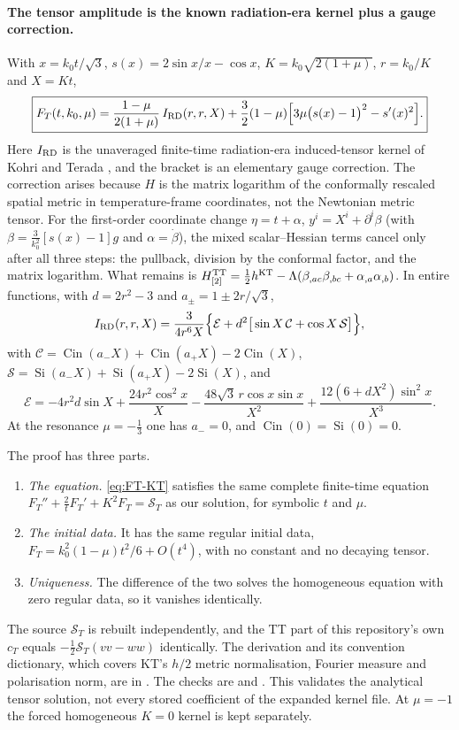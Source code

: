 \documentclass[11pt]{article}
\theoremstyle{definition}
\theoremstyle{remark}
\newcommand{\Cin}{\operatorname{Cin}}
\newcommand{\Si}{\operatorname{Si}}
\begin{document}
\paragraph{The tensor amplitude is the known radiation-era kernel plus a gauge correction.}
With $x=k_0t/\sqrt3$, $s(x)=2\sin x/x-\cos x$, $K=k_0\sqrt{2(1+\mu)}$, $r=k_0/K$ and $X=Kt$,
\begin{equation}\label{eq:FT-KT}
\boxed{F_T(t,k_0,\mu)=\frac{1-\mu}{2(1+\mu)}\,I_{\rm RD}(r,r,X)
+\frac32(1-\mu)\Big[3\mu\big(s(x)-1\big)^2-s'(x)^2\Big].}
\end{equation}
Here $I_{\rm RD}$ is the unaveraged finite-time radiation-era induced-tensor kernel of
Kohri and Terada \cite{KohriTerada}, and the bracket is an elementary gauge correction. The
correction arises because $H$ is the matrix logarithm of the conformally rescaled spatial
metric in temperature-frame coordinates, not the Newtonian metric tensor. For the first-order
coordinate change $\eta=t+\alpha$, $y^i=X^i+\partial^i\beta$ (with $\beta=\frac3{k_0^2}[s(x)-1]g$
and $\alpha=\dot\beta$), the mixed scalar--Hessian terms cancel only after all three steps: the
pullback, division by the conformal factor, and the matrix logarithm. What remains is
$H^{\rm TT}_{[2]}=\frac12h^{\rm KT}-\Lambda(\beta_{,ac}\beta_{,bc}+\alpha_{,a}\alpha_{,b})$.
In entire functions, with $d=2r^2-3$ and $a_\pm=1\pm2r/\sqrt3$,
\[
I_{\rm RD}(r,r,X)=\frac{3}{4r^6X}\Big\{\mathcal E+d^2\big[\sin X\,\mathcal C+\cos X\,\mathcal S\big]\Big\},
\]
with $\mathcal C=\Cin(a_-X)+\Cin(a_+X)-2\Cin(X)$, $\mathcal S=\Si(a_-X)+\Si(a_+X)-2\Si(X)$, and
\[
\mathcal E=-4r^2d\sin X+\frac{24r^2\cos^2x}X-\frac{48\sqrt3\,r\cos x\sin x}{X^2}+\frac{12(6+dX^2)\sin^2x}{X^3}.
\]
At the resonance $\mu=-\frac13$ one has $a_-=0$, and $\Cin(0)=\Si(0)=0$.

The proof has three parts.
\begin{enumerate}
\item \emph{The equation.} \eqref{eq:FT-KT} satisfies the same complete finite-time equation
  $F_T''+\frac2tF_T'+K^2F_T=\mathcal S_T$ as our solution, for symbolic $t$ and $\mu$.
\item \emph{The initial data.} It has the same regular initial data,
  $F_T=k_0^2(1-\mu)t^2/6+O(t^4)$, with no constant and no decaying tensor.
\item \emph{Uniqueness.} The difference of the two solves the homogeneous equation with zero
  regular data, so it vanishes identically.
\end{enumerate}
The source $\mathcal S_T$ is rebuilt independently, and the TT part of this repository's own
$c_T$ equals $-\frac12\mathcal S_T(vv-ww)$ identically. The derivation and its convention
dictionary, which covers KT's $h/2$ metric normalisation, Fourier measure and polarisation
norm, are in . The checks are
 and . This
validates the analytical tensor solution, not every stored coefficient of the expanded kernel
file. At $\mu=-1$ the forced homogeneous $K=0$ kernel is kept separately.
\end{document}
